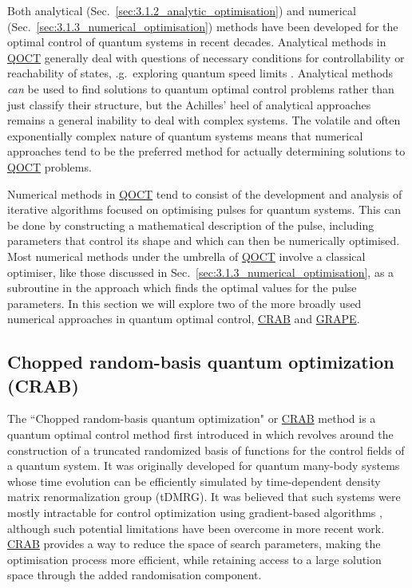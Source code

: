 \documentclass[a4paper,oneside,11pt]{book}
\newcommand{\acrref}[1]{\hyperref[acr:#1]{#1}}
\begin{document}
Both analytical (Sec.~\ref{sec:3.1.2_analytic_optimisation}) and numerical (Sec.~\ref{sec:3.1.3_numerical_optimisation}) methods have been developed for the optimal control of quantum systems in recent decades. Analytical methods in \acrref{QOCT} generally deal with questions of necessary conditions for controllability \cite{schirmer_complete_2001} or reachability of states, \@e.g.~exploring quantum speed limits \cite{khaneja_time_2001, hegerfeldt_driving_2013, poggi_quantum_2013}. Analytical methods \emph{can} be used to find solutions to quantum optimal control problems rather than just classify their structure, but the Achilles' heel of analytical approaches remains a general inability to deal with complex systems. The volatile and often exponentially complex nature of quantum systems means that numerical approaches tend to be the preferred method for actually determining solutions to \acrref{QOCT} problems. 

Numerical methods in \acrref{QOCT} tend to consist of the development and analysis of iterative algorithms focused on optimising pulses for quantum systems. This can be done by constructing a mathematical description of the pulse, including parameters that control its shape and which can then be numerically optimised. Most numerical methods under the umbrella of \acrref{QOCT} involve a classical optimiser, like those discussed in Sec.~\ref{sec:3.1.3_numerical_optimisation}, as a subroutine in the approach which finds the optimal values for the pulse parameters. In this section we will explore two of the more broadly used numerical approaches in quantum optimal control, \acrref{CRAB} and \acrref{GRAPE}. 

\subsection{Chopped random-basis quantum optimization (CRAB)}\label{sec:3.3.1_CRAB}

The ``Chopped random-basis quantum optimization" or \acrref{CRAB} method is a quantum optimal control method first introduced in \cite{doria_optimal_2011, caneva_chopped_2011} which revolves around the construction of a truncated randomized basis of functions for the control fields of a quantum system. It was originally developed for quantum many-body systems whose time evolution can be efficiently simulated by time-dependent density matrix renormalization group (tDMRG)\cite{white_density_1992, schollwock_density-matrix_2005, schollwock_density-matrix_2011}. It was believed that such systems were mostly intractable for control optimization using gradient-based algorithms \cite{brif_control_2010}, although such potential limitations have been overcome in more recent work\cite{jensen_approximate_2021}. \acrref{CRAB} provides a way to reduce the space of search parameters, making the optimisation process more efficient, while retaining access to a large solution space through the added randomisation component.
\end{document}
